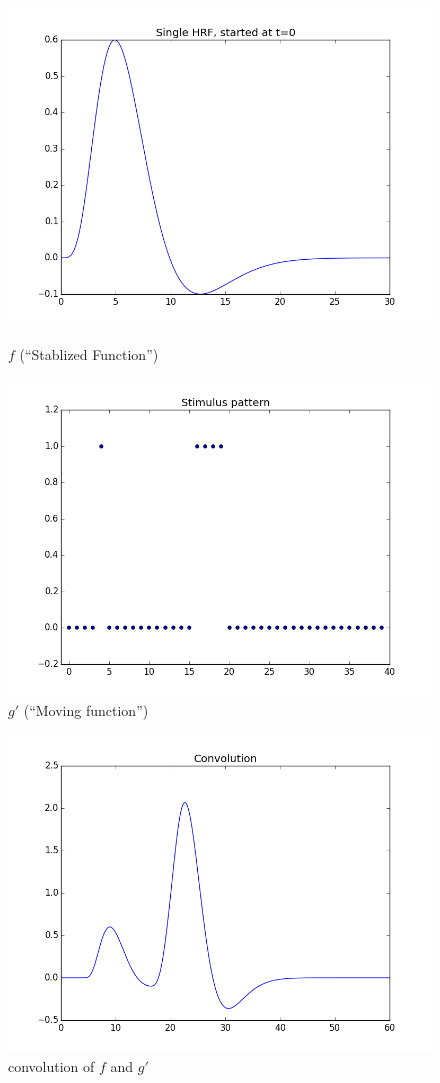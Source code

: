 \documentclass[11pt]{article}
\begin{document}
\begin{figure}[ht]
\centering
\begin{minipage}[b]{0.45\linewidth}
	\centering
	\includegraphics[width=.8\linewidth]{images/hrf_pattern.png} 
	\caption{$f$ (``Stablized Function'')}
	\label{fig:hrf}
\end{minipage}	
\quad
\begin{minipage}[b]{0.45\linewidth}
	\centering
	\includegraphics[width=.8\linewidth]{images/on_off_pattern.png} 
	\caption{$g'$ (``Moving function'')}
	\label{fig:on_off}
\end{minipage}
\end{figure}


\begin{figure}[ht]
	\centering
	\includegraphics[width=.5\linewidth]{images/initial_convolved.png}
	\caption{convolution of $f$ and $g'$}
	\label{fig:convolve1}
\end{figure}
\end{document}
